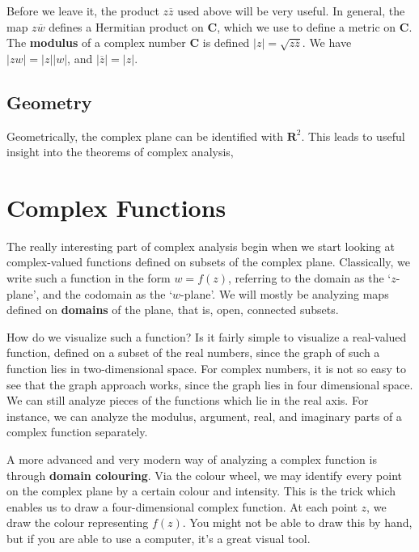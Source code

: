 Before we leave it, the product $z\overline{z}$ used above will be very useful. In general, the map $z\overline{w}$ defines a Hermitian product on $\mathbf{C}$, which we use to define a metric on $\mathbf{C}$. The {\bf modulus} of a complex number $\mathbf{C}$ is defined $|z| = \sqrt{z\overline{z}}$. We have $|zw| = |z||w|$, and $|\overline{z}| = |z|$.

\section{Geometry}

Geometrically, the complex plane can be identified with $\mathbf{R}^2$. This leads to useful insight into the theorems of complex analysis, 

\chapter{Complex Functions}

The really interesting part of complex analysis begin when we start looking at complex-valued functions defined on subsets of the complex plane. Classically, we write such a function in the form $w = f(z)$, referring to the domain as the `$z$-plane', and the codomain as the `$w$-plane'. We will mostly be analyzing maps defined on {\bf domains} of the plane, that is, open, connected subsets.

How do we visualize such a function? Is it fairly simple to visualize a real-valued function, defined on a subset of the real numbers, since the graph of such a function lies in two-dimensional space. For complex numbers, it is not so easy to see that the graph approach works, since the graph lies in four dimensional space. We can still analyze pieces of the functions which lie in the real axis. For instance, we can analyze the modulus, argument, real, and imaginary parts of a complex function separately.

A more advanced and very modern way of analyzing a complex function is through {\bf domain colouring}. Via the colour wheel, we may identify every point on the complex plane by a certain colour and intensity. This is the trick which enables us to draw a four-dimensional complex function. At each point $z$, we draw the colour representing $f(z)$. You might not be able to draw this by hand, but if you are able to use a computer, it's a great visual tool.

